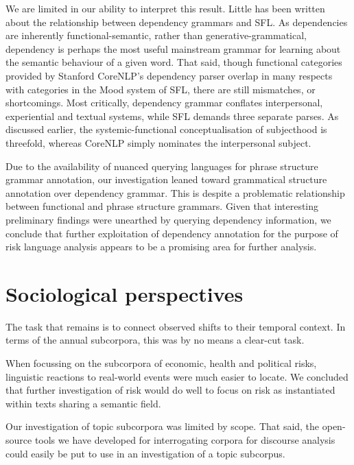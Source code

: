             We are limited in our ability to interpret this result. Little has been written about the relationship between dependency grammars and SFL. As dependencies are inherently functional-semantic, rather than generative-grammatical, dependency is perhaps the most useful  mainstream grammar for learning about the semantic behaviour of a given word. That said, though functional categories provided by Stanford CoreNLP's dependency parser overlap in many respects with categories in the Mood system of SFL, there are still mismatches, or shortcomings. Most critically, dependency grammar conflates interpersonal, experiential and textual systems, while SFL demands three separate parses. As discussed earlier, the systemic-functional conceptualisation of subjecthood is threefold, whereas CoreNLP simply nominates the interpersonal subject.

            Due to the availability of nuanced querying languages for phrase structure grammar annotation, our investigation leaned toward grammatical structure annotation over dependency grammar. This is despite a problematic relationship between functional and phrase structure grammars. Given that interesting preliminary findings were unearthed by querying dependency information, we conclude that further exploitation of dependency annotation for the purpose of risk language analysis appears to be a promising area for further analysis.

	\section{Sociological perspectives}
            
	The task that remains is to connect observed shifts to their temporal context. In terms of the annual subcorpora, this was by no means a clear-cut task.

	When focussing on the subcorpora of economic, health and political risks, linguistic reactions to real-world events were much easier to locate. We concluded that further investigation of risk would do well to focus on risk as instantiated within texts sharing a semantic field. 

            Our investigation of topic subcorpora was limited by scope. That said, the open-source tools we have developed for interrogating corpora for discourse analysis could easily be put to use in an investigation of a topic subcorpus.

